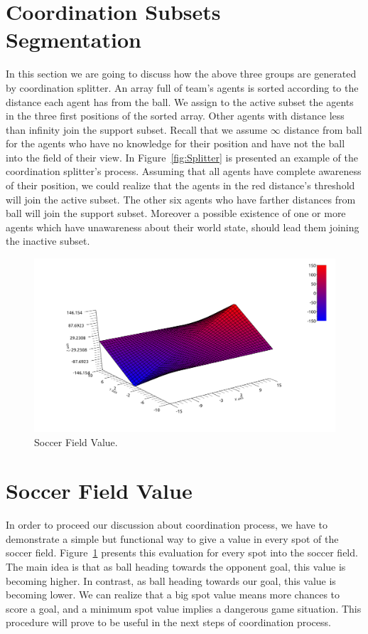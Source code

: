 \section{Coordination Subsets Segmentation}
In this section we are going to discuss how the above three groups are generated by coordination splitter. An array full of team's agents is sorted according to the distance each agent has from the ball. We assign to the active subset the agents in the three first positions of the sorted array.
Other agents with distance less than infinity join the support subset.
Recall that we assume $\infty$ distance from ball for the agents who have no knowledge for their position and have not the ball into the field of their view.
In Figure~\ref{fig:Splitter} is presented an example of the coordination splitter's process. Assuming that all agents have complete awareness of their position, we could realize that the agents in the red distance's threshold will join the active subset. The other six agents who have farther distances from ball will join the support subset. Moreover a possible existence of one or more agents which have unawareness about their world state, should lead them joining the inactive subset.

\begin{figure}[t!]
\centering
  \includegraphics[width=\textwidth]{Chapter4/figures/Graph1.pdf}
  \caption{Soccer Field Value.} 
  \label{fig:SoccerValue}
\end{figure}



\section{Soccer Field Value}
\label{FieldValue}

In order to proceed our discussion about coordination process, we have to demonstrate a simple but functional way to give a value in every spot of the soccer field. Figure~\ref{fig:SoccerValue} presents this evaluation for every spot into the soccer field. The main idea is that as ball heading towards the opponent goal, this value is becoming higher. In contrast, as ball heading towards our goal, this value is becoming lower. We can realize that a big spot value means more chances to score a goal, and a minimum spot value implies a dangerous game situation. This procedure will prove to be useful in the next steps of coordination process.


